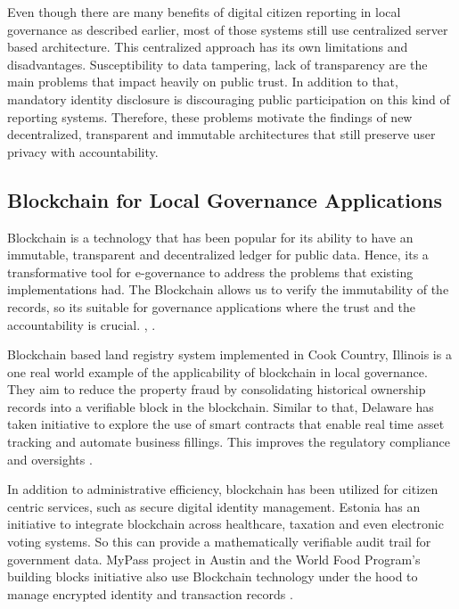 Even though there are many benefits of digital citizen reporting in local governance as described earlier, most of those systems still use centralized server based architecture. This centralized approach has its own limitations and  disadvantages. Susceptibility to data tampering, lack of transparency are the main problems that impact heavily on public trust. In addition to that, mandatory identity disclosure is discouraging public participation on this kind of reporting systems. Therefore, these problems motivate the findings of new decentralized, transparent and immutable architectures that still preserve user privacy with accountability.

\subsection{Blockchain for Local Governance Applications}

Blockchain is a technology that has been popular for its ability to have an immutable, transparent and decentralized ledger for public data. Hence, its a transformative tool for e-governance to address the problems that existing implementations had. The Blockchain allows us to verify the immutability of the records, so its suitable for governance applications where the trust and the accountability is crucial. \cite{hamill2018blockchain}, \cite{goswami2020egovernance}.

Blockchain based land registry system implemented in Cook Country, Illinois is a one real world example of the applicability of blockchain in local governance. They aim to reduce the property fraud by consolidating historical ownership records into a verifiable block in the blockchain. Similar to that, Delaware has taken initiative to explore the use of smart contracts that enable real time asset tracking and automate business fillings. This improves the regulatory compliance and oversights \cite{goswami2020egovernance}.

In addition to administrative efficiency, blockchain has been utilized for citizen centric services, such as secure digital identity management. Estonia has an initiative to integrate blockchain across healthcare, taxation and even electronic voting systems. So this can provide a mathematically verifiable audit trail for government data. MyPass project in Austin and the World Food Program's building blocks initiative also use Blockchain technology under the hood to manage encrypted identity and transaction records \cite{hamill2018blockchain}.

